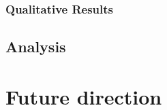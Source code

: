 \documentclass{article}
\begin{document}
\subsubsection{Qualitative Results}

\subsection{Analysis}


\section{Future direction}

\newpage


\end{document}
